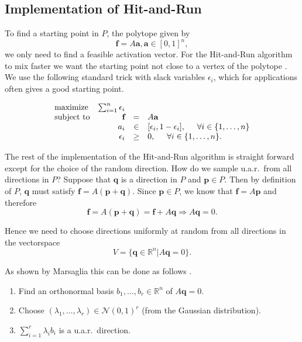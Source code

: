 \subsection{Implementation of Hit-and-Run}
To find a starting point in $P$, the polytope given by
\[\textbf{f} = A\textbf{a}, \textbf{a} \in [0,1]^n,\]
we only need to find a feasible activation vector. For the Hit-and-Run algorithm to mix faster we want the starting point not close to a vertex of the polytope \cite{Lovasz}. %
We use the following standard trick with slack variables $\epsilon_i$, which for applications often gives a good starting point.%

\begin{equation}\label{eq:LP_r}
\begin{array}{lrcl}
\mbox{maximize} & \sum_{i=1}^n \epsilon_i \\ 
\mbox{subject to} & \textbf{f} &=& A\textbf{a}\\
  & a_i &\in& [\epsilon_i, 1- \epsilon_i], \hspace{5mm} \forall i \in \{1,\dots,n\}  \\
  & \epsilon_i &\geq& 0, \hspace{5mm} \forall i \in \{1,\dots,n\}.  
\end{array}
\end{equation}


The rest of the implementation of the Hit-and-Run algorithm is straight forward except for the choice of the random direction. How do we sample u.a.r.\ from all directions in $P$? Suppose that $\textbf{q}$ is a direction in $P$ and $\textbf{p} \in P$. Then by definition of $P$, $\textbf{q}$ must satisfy $\textbf{f} = A(\textbf{p}+\textbf{q})$. Since $\textbf{p} \in P$, we know that $\textbf{f} = A\textbf{p}$ and therefore 
\[\textbf{f} = A(\textbf{p} + \textbf{q}) = \textbf{f} + A\textbf{q} \Rightarrow A\textbf{q} = 0. \]

Hence we need to choose directions uniformly at random from all directions in the vectorspace 
\[V = \{\textbf{q} \in \mathbb{R}^n | A\textbf{q} = 0\}.\]

As shown by Marsaglia this can be done as follows \cite{Marsaglia}.

\begin{enumerate}
\item
Find an orthonormal basis $b_1, \dots, b_r \in \mathbb{R}^{n}$ of $A\textbf{q} =0$.
\item
Choose $(\lambda_1, \dots, \lambda_r) \in \mathcal{N}(0,1)^r$ (from the Gaussian distribution).
\item
$\sum_{i=1}^r \lambda_i b_i$ is a u.a.r.\ direction.
\end{enumerate}

